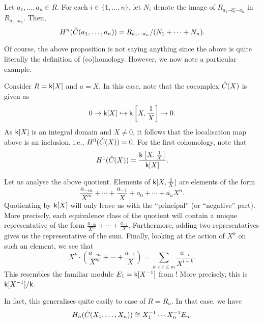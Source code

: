 \begin{prop}
	Let $a_{1}, \ldots, a_{n} \in R$. For each $i \in \{1, \ldots, n\}$, let $N_{i}$ denote the image of $R_{a_{1} \cdots \widehat{a_{i}} \cdots a_{n}}$ in $R_{a_{1} \cdots a_{n}}$. Then,
	\begin{equation*} 
		H^{n}(\check{C}(a_{1}, \ldots, a_{n})) = R_{a_{1} \cdots a_{n}}/(N_{1} + \cdots + N_{n}).
	\end{equation*}
\end{prop}

Of course, the above proposition is not saying anything since the above is quite literally the definition of (co)homology. However, we now note a particular example.

\begin{ex}
	Consider $R = \mathsf{k}[X]$ and $a = X$. In this case, note that the \Cech cocomplex $\check{C}(X)$ is given as
	\begin{equation*} 
		0 \to \mathsf{k}[X] \hookrightarrow \mathsf{k}\left[X, \frac{1}{X}\right] \to 0.
	\end{equation*}
	As $\mathsf{k}[X]$ is an integral domain and $X \neq 0$, it follows that the localisation map above is an inclusion, i.e., $H^{0}(\check{C}(X)) = 0$. For the first cohomology, note that
	\begin{equation*} 
		H^{1}(\check{C}(X)) = \frac{\mathsf{k}\left[X, \frac{1}{X}\right]}{\mathsf{k}[X]}.
	\end{equation*}

	Let us analyse the above quotient. Elements of $\mathsf{k}[X, \frac{1}{X}]$ are elements of the form
	\begin{equation*} 
		\frac{a_{-m}}{X^{m}} + \cdots + \frac{a_{-1}}{X} + a_{0} + \cdots + a_{n} X^{n}.
	\end{equation*}
	Quotienting by $\mathsf{k}[X]$ will only leave us with the ``principal'' (or ``negative'' part). More precisely, each equivalence class of the quotient will contain a unique representative of the form $\frac{a_{-m}}{X^{m}} + \cdots + \frac{a_{-1}}{X}$. Furthermore, adding two representatives gives us the representative of the sum. Finally, looking at the action of $X^{k}$ on such an element, we see that
	\begin{equation*} 
		X^{k} \cdot \left(\frac{a_{-m}}{X^{m}} + \cdots + \frac{a_{-1}}{X}\right) = \sum_{k < i \le m} \frac{a_{-i}}{X^{i - k}}.
	\end{equation*}
	This resembles the familiar module $E_{1} = \mathsf{k}[X^{-1}]$ from ! More precisely, this is $\mathsf{k}[X^{-1}]/\mathsf{k}$.

	In fact, this generalises quite easily to case of $R = R_{n}$. In that case, we have
	\begin{equation*} 
		H_{n}(\CC(X_{1}, \ldots, X_{n})) \cong X_{1}^{-1} \cdots X_{n}^{-1}E_{n}.%
	\end{equation*}


\end{ex}
